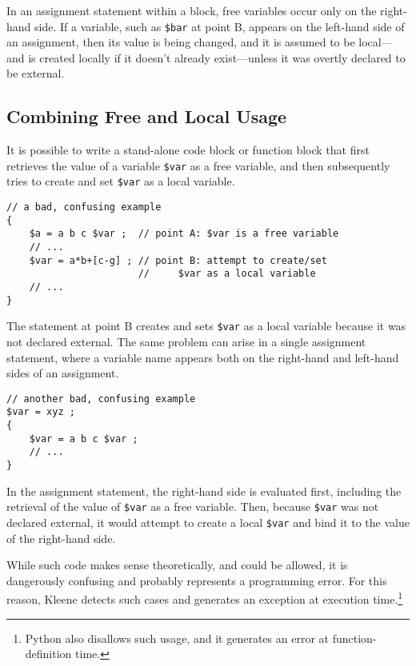 In an assignment statement within a block, free variables occur only on the right-hand side.
If a variable, such as \verb!$bar! at point B, 
appears on the left-hand side of an assignment, then its value is being
changed, and it is assumed to be local---and is created locally if it doesn't already
exist---unless it was overtly declared to be external.

\subsection{Combining Free and Local Usage}

It is possible to write a stand-alone code block or function block that first retrieves
the value of a
variable \verb!$var! as a free variable, and then subsequently tries to create and set
\verb!$var! as a local variable.

\begin{samepage}
\begin{Verbatim}
// a bad, confusing example
{
    $a = a b c $var ;  // point A: $var is a free variable
    // ...
    $var = a*b+[c-g] ; // point B: attempt to create/set
                       //     $var as a local variable
    // ...
}
\end{Verbatim}
\end{samepage}

\noindent
The statement at point B creates and sets \verb!$var! as a local variable because it was
not declared external.  The same problem can arise in a single assignment statement,
where a variable name appears both on the right-hand and left-hand sides of an
assignment.

\begin{samepage}
\begin{Verbatim}
// another bad, confusing example
$var = xyz ;
{
    $var = a b c $var ;  
    // ...
}
\end{Verbatim}
\end{samepage}

\noindent
In the assignment statement, the right-hand side is evaluated first, including the
retrieval of the value of \verb!$var! as a free variable.  Then, because \verb!$var! was
not declared external, it would attempt to create a local \verb!$var! and bind it to the
value of the right-hand side.


While such code makes sense theoretically, and could be allowed,
it is dangerously confusing and probably represents a programming error.  For this
reason, Kleene detects such cases and generates an exception at execution
time.\footnote{Python also disallows such usage, and it generates an error at
function-definition time.}


